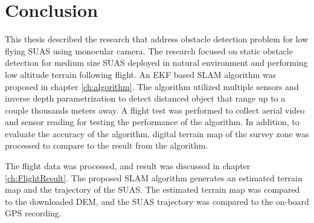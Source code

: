 \chapter{Conclusion}\label{ch:conclusion}

This thesis described the research that address obstacle
detection problem for low flying SUAS using monocular camera. The
research focused on static obstacle detection for medium size SUAS
deployed in natural environment and performing low altitude terrain
following flight.  An EKF based SLAM algorithm was
proposed in chapter \ref{ch:algorithm}. The algorithm utilized
multiple sensors and inverse depth parametrization to detect distanced
object that range up to a couple thousands meters away. A flight test
was performed to collect aerial video and sensor reading for testing
the performance of the algorithm. In addition, to evaluate the
accuracy of the algorithm, digital terrain map of the survey zone was
processed to compare to the result from the algorithm. 

The flight data was processed, and result was discussed in chapter
\ref{ch:FlightResult}. The proposed SLAM algorithm generates an
estimated terrain map and the trajectory of the SUAS. The estimated
terrain map was compared to the downloaded DEM, and the SUAS
trajectory was compared to the on-board GPS recording. 

